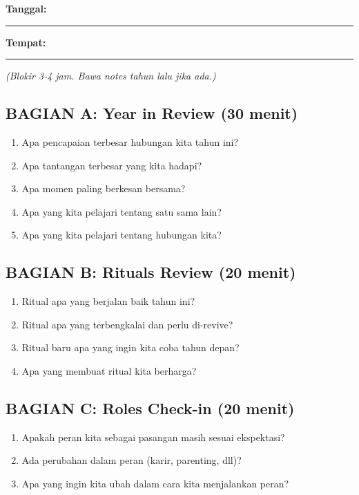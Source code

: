 \begin{exercisebox}
\textbf{Tanggal:} \rule{4cm}{0.4pt} \textbf{Tempat:} \rule{5cm}{0.4pt}

\textit{(Blokir 3-4 jam. Bawa notes tahun lalu jika ada.)}

\subsection*{BAGIAN A: Year in Review (30 menit)}
\begin{enumerate}
    \item Apa pencapaian terbesar hubungan kita tahun ini?
    \item Apa tantangan terbesar yang kita hadapi?
    \item Apa momen paling berkesan bersama?
    \item Apa yang kita pelajari tentang satu sama lain?
    \item Apa yang kita pelajari tentang hubungan kita?
\end{enumerate}

\subsection*{BAGIAN B: Rituals Review (20 menit)}
\begin{enumerate}
    \item Ritual apa yang berjalan baik tahun ini?
    \item Ritual apa yang terbengkalai dan perlu di-revive?
    \item Ritual baru apa yang ingin kita coba tahun depan?
    \item Apa yang membuat ritual kita berharga?
\end{enumerate}

\subsection*{BAGIAN C: Roles Check-in (20 menit)}
\begin{enumerate}
    \item Apakah peran kita sebagai pasangan masih sesuai ekspektasi?
    \item Ada perubahan dalam peran (karir, parenting, dll)?
    \item Apa yang ingin kita ubah dalam cara kita menjalankan peran?
\end{enumerate}


\end{exercisebox}
